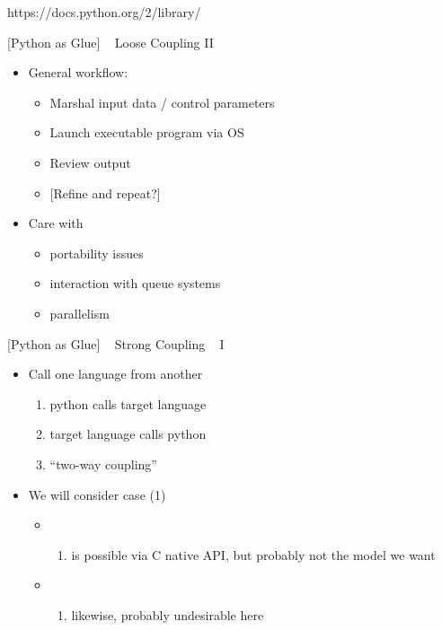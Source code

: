\documentclass{article}
\begin{document}
https://docs.python.org/2/library/

    {[}Python as Glue{]} ~ Loose Coupling II

\begin{itemize}
\itemsep1pt\parskip0pt
\item
  General workflow:

  \begin{itemize}
  \itemsep1pt\parskip0pt
  \item
    Marshal input data / control parameters
  \item
    Launch executable program via OS
  \item
    Review output
  \item
    {[}Refine and repeat?{]}
  \end{itemize}
\item
  Care with

  \begin{itemize}
  \itemsep1pt\parskip0pt
  \item
    portability issues
  \item
    interaction with queue systems
  \item
    parallelism
  \end{itemize}
\end{itemize}

    {[}Python as Glue{]} ~ Strong Coupling ~ I

\begin{itemize}
\itemsep1pt\parskip0pt
\item
  Call one language from another

  \begin{enumerate}
  \def\labelenumi{\arabic{enumi}.}
  \itemsep1pt\parskip0pt
  \item
    python calls target language
  \item
    target language calls python
  \item
    ``two-way coupling'' ~
  \end{enumerate}
\item
  We will consider case (1)

  \begin{itemize}
  \item
    \begin{enumerate}
    \def\labelenumi{(\arabic{enumi})}
    \setcounter{enumi}{1}
    \itemsep1pt\parskip0pt
    \item
      is possible via C native API, but probably not the model we want
    \end{enumerate}
  \item
    \begin{enumerate}
    \def\labelenumi{(\arabic{enumi})}
    \setcounter{enumi}{2}
    \itemsep1pt\parskip0pt
    \item
      likewise, probably undesirable here
    \end{enumerate}
  \end{itemize}
\end{itemize}
\end{document}

